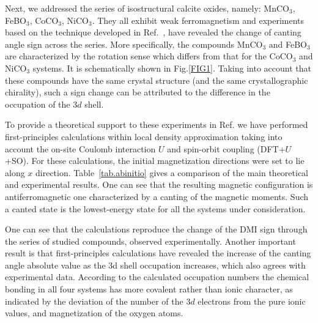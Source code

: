 \documentclass[aps,prl,twocolumn,showpacs,amsmath,amssymb]{revtex4-1}
\begin{document}
Next, we addressed the series of isostructural calcite oxides, namely: MnCO$_3$, FeBO$_3$, CoCO$_3$, NiCO$_3$. 
They all exhibit weak ferromagnetism and experiments based on the technique developed in Ref.~\cite{dmitrienko-natphys}, have revealed the change of canting angle sign across the series\cite{carbonates}. 
More specifically, the compounds MnCO$_3$ and FeBO$_3$ are characterized by the rotation sense which differs from that for the CoCO$_3$ and NiCO$_3$ systems. 
It is schematically shown in Fig.\ref{FIG1}. 
Taking into account that these compounds have the same crystal structure (and the same crystallographic chirality), such a sign change can be attributed to the difference in the occupation of the $3d$ shell.

To provide a theoretical support to these experiments in Ref.\cite{carbonates} we have performed first-principles calculations within local density approximation taking into account the on-site Coulomb interaction $U$ and spin-orbit coupling (DFT+$U$+SO). For these calculations, the initial magnetization directions were set to lie along $x$ direction.
Table~\ref{tab.abinitio} gives a comparison of the main theoretical and experimental results.  One can see that the resulting magnetic configuration is antiferromagnetic one characterized by a canting of the magnetic moments. Such a canted state is the lowest-energy state for all the systems under consideration.

One can see that the calculations reproduce the change of the DMI sign through the series of studied compounds, observed experimentally.  Another important result is that first-principles calculations have revealed the increase of the canting angle absolute value as the 3d shell occupation increases, which also agrees with experimental data. According to the calculated occupation numbers the chemical bonding in all four systems has more covalent rather than ionic character, as indicated
by the deviation of the number of the $3d$ electrons from the pure ionic values, and magnetization of the oxygen atoms.
\end{document}
